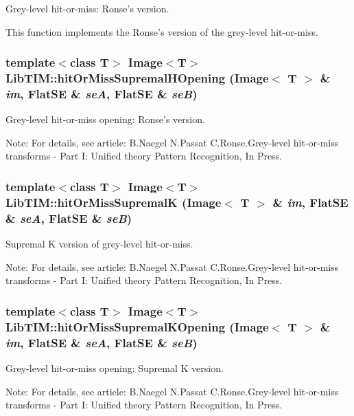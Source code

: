 Grey-level hit-or-miss: Ronse's version. 

This function implements the Ronse's version of the grey-level hit-or-miss.
\subsubsection{\setlength{\rightskip}{0pt plus 5cm}template$<$class T$>$ Image$<$T$>$ Lib\-TIM::hit\-Or\-Miss\-Supremal\-HOpening (Image$<$ T $>$ \& {\em im}, Flat\-SE \& {\em se\-A}, Flat\-SE \& {\em se\-B})}\label{group__interval_ga7}


Grey-level hit-or-miss opening: Ronse's version. 

\begin{Desc}
\item[Note:]For details, see article: B.Naegel N.Passat C.Ronse.Grey-level hit-or-miss transforms - Part I: Unified theory Pattern Recognition, In Press.\end{Desc}
\subsubsection{\setlength{\rightskip}{0pt plus 5cm}template$<$class T$>$ Image$<$T$>$ Lib\-TIM::hit\-Or\-Miss\-Supremal\-K (Image$<$ T $>$ \& {\em im}, Flat\-SE \& {\em se\-A}, Flat\-SE \& {\em se\-B})}\label{group__interval_ga4}


Supremal K version of grey-level hit-or-miss. 

\begin{Desc}
\item[Note:]For details, see article: B.Naegel N.Passat C.Ronse.Grey-level hit-or-miss transforms - Part I: Unified theory Pattern Recognition, In Press.\end{Desc}
\subsubsection{\setlength{\rightskip}{0pt plus 5cm}template$<$class T$>$ Image$<$T$>$ Lib\-TIM::hit\-Or\-Miss\-Supremal\-KOpening (Image$<$ T $>$ \& {\em im}, Flat\-SE \& {\em se\-A}, Flat\-SE \& {\em se\-B})}\label{group__interval_ga6}


Grey-level hit-or-miss opening: Supremal K version. 

\begin{Desc}
\item[Note:]For details, see article: B.Naegel N.Passat C.Ronse.Grey-level hit-or-miss transforms - Part I: Unified theory Pattern Recognition, In Press.\end{Desc}

